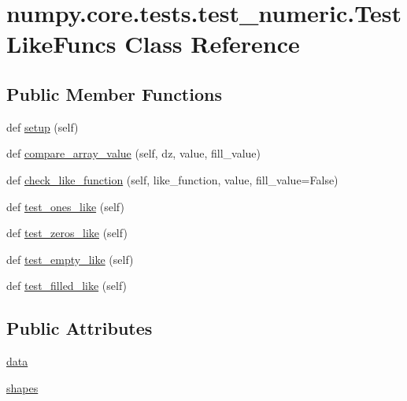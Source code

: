 \hypertarget{classnumpy_1_1core_1_1tests_1_1test__numeric_1_1TestLikeFuncs}{}\section{numpy.\+core.\+tests.\+test\+\_\+numeric.\+Test\+Like\+Funcs Class Reference}
\label{classnumpy_1_1core_1_1tests_1_1test__numeric_1_1TestLikeFuncs}
\subsection*{Public Member Functions}
\begin{DoxyCompactItemize}
\item 
def \hyperlink{classnumpy_1_1core_1_1tests_1_1test__numeric_1_1TestLikeFuncs_a2587c48a6c87e9572934ce5b7e580b8d}{setup} (self)
\item 
def \hyperlink{classnumpy_1_1core_1_1tests_1_1test__numeric_1_1TestLikeFuncs_afcca9fee7402d9425e5200348e443353}{compare\+\_\+array\+\_\+value} (self, dz, value, fill\+\_\+value)
\item 
def \hyperlink{classnumpy_1_1core_1_1tests_1_1test__numeric_1_1TestLikeFuncs_a1a8ab6768516f1449c795ec161b0d53a}{check\+\_\+like\+\_\+function} (self, like\+\_\+function, value, fill\+\_\+value=False)
\item 
def \hyperlink{classnumpy_1_1core_1_1tests_1_1test__numeric_1_1TestLikeFuncs_a8fbf6db0c5d7ab693de6b7a6fc37b756}{test\+\_\+ones\+\_\+like} (self)
\item 
def \hyperlink{classnumpy_1_1core_1_1tests_1_1test__numeric_1_1TestLikeFuncs_a61a8c1eb63017b9182b14aee1b3a61c0}{test\+\_\+zeros\+\_\+like} (self)
\item 
def \hyperlink{classnumpy_1_1core_1_1tests_1_1test__numeric_1_1TestLikeFuncs_a404fc9070e167d0a2953368e2d840164}{test\+\_\+empty\+\_\+like} (self)
\item 
def \hyperlink{classnumpy_1_1core_1_1tests_1_1test__numeric_1_1TestLikeFuncs_afa7b9e4714923c278f9ebb2141784041}{test\+\_\+filled\+\_\+like} (self)
\end{DoxyCompactItemize}
\subsection*{Public Attributes}
\begin{DoxyCompactItemize}
\item 
\hyperlink{classnumpy_1_1core_1_1tests_1_1test__numeric_1_1TestLikeFuncs_a8a67089223f3a085f8d6638c81483474}{data}
\item 
\hyperlink{classnumpy_1_1core_1_1tests_1_1test__numeric_1_1TestLikeFuncs_a817c15aae9dce3415e61c8192c1130d8}{shapes}
\end{DoxyCompactItemize}



